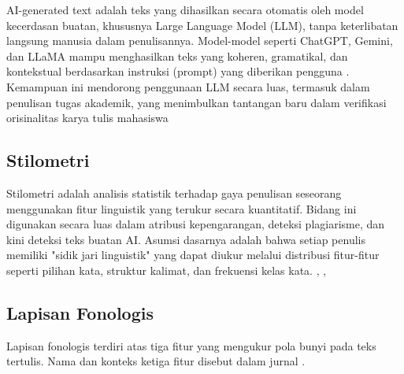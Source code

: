 AI-generated text adalah teks yang dihasilkan secara otomatis oleh model kecerdasan buatan, khususnya Large Language Model (LLM), tanpa keterlibatan langsung manusia dalam penulisannya. Model-model seperti ChatGPT, Gemini, dan LLaMA mampu menghasilkan teks yang koheren, gramatikal, dan kontekstual berdasarkan instruksi (prompt) yang diberikan pengguna \cite{Farrell2026}. Kemampuan ini mendorong penggunaan LLM secara luas, termasuk dalam penulisan tugas akademik, yang menimbulkan tantangan baru dalam verifikasi orisinalitas karya tulis mahasiswa

\subsection{Stilometri}

Stilometri adalah analisis statistik terhadap gaya penulisan seseorang menggunakan fitur linguistik yang terukur secara kuantitatif. Bidang ini digunakan secara luas dalam atribusi kepengarangan, deteksi plagiarisme, dan kini deteksi teks buatan AI. Asumsi dasarnya adalah bahwa setiap penulis memiliki "sidik jari linguistik" yang dapat diukur melalui distribusi fitur-fitur seperti pilihan kata, struktur kalimat, dan frekuensi kelas kata. \cite{Jaashan2025}, \cite{Tschuggnall2015}, \cite{Of2026}

\subsection{Lapisan Fonologis}

Lapisan fonologis terdiri atas tiga fitur yang mengukur pola bunyi pada teks tertulis. Nama dan konteks ketiga fitur disebut dalam jurnal \cite{Farrell2026}.

